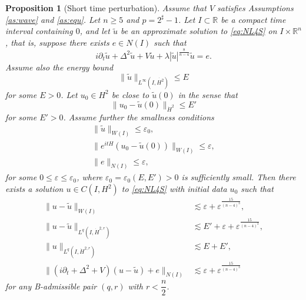 \documentclass[11pt,a4paper]{article}
\numberwithin{equation}{section}
\newtheorem{proposition}[theorem]{Proposition}
\begin{document}
\begin{proposition}[Short time perturbation]\label{Short time perturbation}
Assume that $V$ satisfies Assumptions \ref{as:wave} and \ref{as:equ}. Let $n \geq 5$ and $p = 2^{\sharp} - 1$.
Let $I \subset \mathbb{R}$ be a compact time interval containing $0$, and let $\tilde{u}$ be an approximate solution to \eqref{eq:NL4S} on $I \times \mathbb{R}^{n}$, that is, suppose there exists $e \in N(I)$ such that
\begin{equation}\label{approximate NL4S}
i\partial_{t}\tilde{u} + \Delta^{2}\tilde{u} + V\tilde{u} + \lambda|\tilde{u}|^{\frac{8}{n-4}}\tilde{u} = e.
\end{equation}
Assume also the energy bound
\begin{equation}\label{energy bound}
\|\tilde{u}\|_{L^{\infty}(I, \dot{H^{2}})} \leq E
\end{equation}
for some $E >0$.
Let $u_{0} \in H^{2}$ be close to $\tilde{u}(0)$ in the sense that
\begin{equation}\label{close to initial data}
\|u_{0} - \tilde{u}(0) \|_{\dot{H}^{2}} \leq E'
\end{equation}
for some $E' >0$.
Assume further the smallness conditions
\begin{align}
\|\tilde{u}\|_{W(I)} \leq \varepsilon_{0}, \label{small condition 1}\\
\|e^{itH}\left(u_{0} - \tilde{u}(0)\right)\|_{W(I)} \leq \varepsilon, \label{small condition 2}\\
\|e\|_{N(I)} \leq \varepsilon, \label{small condition 3}
\end{align}
for some $0 \leq \varepsilon \leq \varepsilon_{0}$, where $\varepsilon_{0} = \varepsilon_{0}(E, E') > 0$ is sufficiently small.
Then there exists a solution $u\in C(I, H^{2})$ to \eqref{eq:NL4S} with initial data $u_{0}$ such that
\begin{align}
\|u - \tilde{u}\|_{W(I)} &\lesssim \varepsilon + \varepsilon^{\frac{15}{(n-4)^{3}}}, \label{short stability conclusion 1}\\
\|u - \tilde{u}\|_{L^{q}(I, \dot{H}^{2, r})} &\lesssim E' + \varepsilon  + \varepsilon^{\frac{15}{(n-4)^{3}}},\label{short stability conclusion 2}\\
\|u\|_{L^{q}(I, \dot{H}^{2, r})} &\lesssim E + E', \label{short stability conclusion 3}\\
\|(i\partial_{t} + \Delta^{2} + V)(u - \tilde{u}) + e\|_{N(I)} &\lesssim \varepsilon + \varepsilon^{\frac{15}{(n-4)^{3}}}\label{short stability conclusion 4}
\end{align}
for any B-admissible pair $(q, r)$ with $r < \dfrac{n}{2}$.
\end{proposition}
\end{document}
